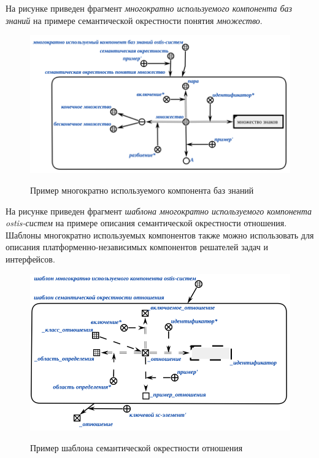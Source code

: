 На рисунке \textit{} приведен фрагмент \textit{многократно используемого компонента баз знаний} на примере семантической окрестности понятия \textit{множество}.

\begin{figure}[H]
	\caption{Пример многократно используемого компонента баз знаний}
	\includegraphics[scale=0.6]{author/part5/figures/set_neighbourhood.png}
	\label{fig:set_neighbourhood}
\end{figure}

На рисунке \textit{} приведен фрагмент \textit{шаблона многократно используемого компонента ostis-систем} на примере описания семантической окрестности отношения. Шаблоны многократно используемых компонентов также можно использовать для описания платформенно-независимых компонентов решателей задач и интерфейсов.

\begin{figure}[H]
	\caption{Пример шаблона семантической окрестности отношения}
	\includegraphics[scale=0.6]{author/part5/figures/relation_template.png}
	\label{fig:relation_template}
\end{figure}

